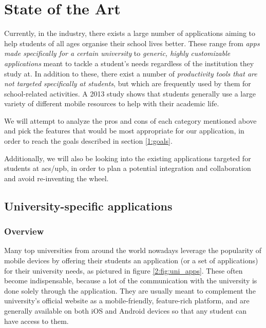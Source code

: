 \chapter{State of the Art} \label{chapter2}

Currently, in the industry, there exists a large number of applications aiming to help students of all ages organise their school lives better. These range from \textit{apps made specifically for a certain university} to \textit{generic, highly customizable applications} meant to tackle a student's needs regardless of the institution they study at. In addition to these, there exist a number of \textit{productivity tools that are not targeted specifically at students}, but which are frequently used by them for school-related activities. A 2013 study\cite{chen2013exploring} shows that students generally use a large variety of different mobile resources to help with their academic life.

We will attempt to analyze the pros and cons of each category mentioned above and pick the features that would be most appropriate for our application, in order to reach the goals described in section \ref{1:goals}.

Additionally, we will also be looking into the existing applications targeted for students at \acrshort{acs}/\acrshort{upb}, in order to plan a potential integration and collaboration and avoid re-inventing the wheel.

\section{University-specific applications} \label{2:uni_apps}

    \subsection{Overview} \label{2:uni_apps_overview}

        Many top universities from around the world nowadays leverage the popularity of mobile devices by offering their students an application (or a set of applications) for their university needs, as pictured in figure \ref{2:fig:uni_apps}. These often become indispensable, because a lot of the communication with the university is done solely through the application. They are usually meant to complement the university's official website as a mobile-friendly, feature-rich platform, and are generally available on both iOS and Android devices so that any student can have access to them.
        
